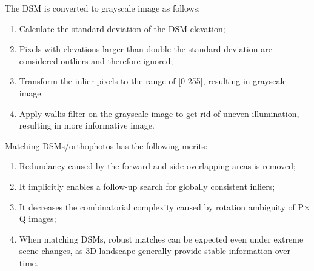 %

The DSM is converted to grayscale image as follows:\\
\begin{enumerate}
    \item Calculate the standard deviation of the DSM elevation;
    \item Pixels with elevations larger than double the standard deviation are considered outliers and therefore ignored;
    \item Transform the inlier pixels to the range of [0-255], resulting in grayscale image.
    \item Apply wallis filter on the grayscale image to get rid of uneven illumination, resulting in more informative image.
\end{enumerate}
\par
Matching DSMs/orthophotos has the following merits:
\begin{enumerate}
    \item Redundancy caused by the forward and side overlapping areas is removed;
    \item It implicitly enables a follow-up search for globally consistent inliers;
    \item It decreases the combinatorial complexity caused by rotation ambiguity of P$\times$Q images;
    \item When matching DSMs, robust matches can be expected even under extreme scene changes, as 3D landscape generally provide stable information over time.
\end{enumerate}

